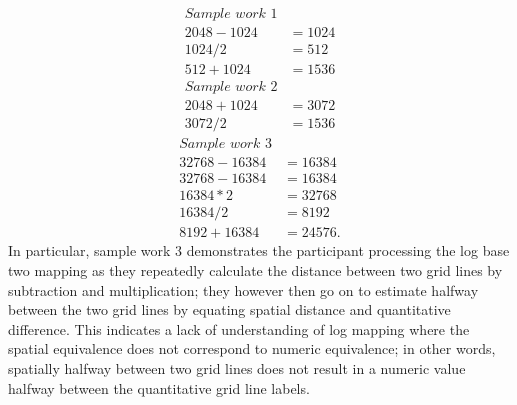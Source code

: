 \documentclass[print]{nuthesis}
\begin{document}
\begin{align}
\textit{Sample work 1} \nonumber\\
2048-1024 &= 1024 \nonumber \\
1024/2 &= 512 \nonumber\\
512+1024 &= 1536 \nonumber
\end{align}
\begin{align}
\textit{Sample work 2} \nonumber\\
2048 + 1024 & =3072 \nonumber\\
3072/2 & =1536 \nonumber
\end{align}
\begin{align}
\textit{Sample work 3} \nonumber\\
32768-16384&=16384  \nonumber\\
32768-16384&=16384  \nonumber\\
16384*2&=32768  \nonumber\\
16384/2&=8192  \nonumber\\
8192+16384&=24576.  \nonumber
\end{align}
In particular, sample work 3 demonstrates the participant processing the log base two mapping as they repeatedly calculate the distance between two grid lines by subtraction and multiplication; they however then go on to estimate halfway between the two grid lines by equating spatial distance and quantitative difference.
This indicates a lack of understanding of log mapping where the spatial equivalence does not correspond to numeric equivalence; in other words, spatially halfway between two grid lines does not result in a numeric value halfway between the quantitative grid line labels.
\end{document}
